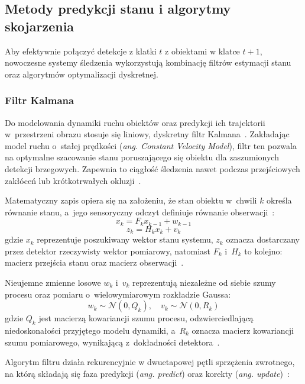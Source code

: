 \subsection{Metody predykcji stanu i algorytmy skojarzenia}
Aby efektywnie połączyć detekcje z klatki $t$ z obiektami w klatce $t+1$, nowoczesne systemy
śledzenia wykorzystują kombinację filtrów estymacji stanu oraz algorytmów optymalizacji dyskretnej.

\subsubsection{Filtr Kalmana}

Do modelowania dynamiki ruchu obiektów oraz predykcji ich trajektorii w~przestrzeni obrazu stosuje
się liniowy, dyskretny filtr Kalmana~\cite{kalman1960, bewley2016}. Zakładając model ruchu o~stałej
prędkości (\textit{ang. Constant Velocity Model}), filtr ten pozwala na optymalne szacowanie stanu
poruszającego się obiektu dla zaszumionych detekcji brzegowych. Zapewnia to ciągłość śledzenia
nawet podczas przejściowych zakłóceń lub krótkotrwałych okluzji~\cite{bewley2016}.

Matematyczny zapis opiera się na założeniu, że stan obiektu w~chwili $k$ określa równanie stanu,
a~jego sensoryczny odczyt definiuje równanie obserwacji~\cite{kalman1960}:
\begin{equation}
  x_k = F_k x_{k-1} + w_{k-1}
  \label{eq:state_equation}
\end{equation}
\begin{equation}
  z_k = H_k x_k + v_k
  \label{eq:measurement_equation}
\end{equation}
gdzie $x_k$ reprezentuje poszukiwany wektor stanu systemu, $z_k$ oznacza dostarczany przez detektor rzeczywisty wektor pomiarowy, natomiast $F_k$ i~$H_k$ to kolejno: macierz przejścia stanu oraz macierz obserwacji~\cite{kalman1960}.

Nieujemne zmienne losowe $w_k$ i~$v_k$ reprezentują niezależne od siebie szumy procesu oraz pomiaru
o~wielowymiarowym rozkładzie Gaussa:
\begin{equation}
  w_k \sim \mathcal{N}(0, Q_k), \quad v_k \sim \mathcal{N}(0, R_k)
\end{equation}
gdzie $Q_k$ jest macierzą kowariancji szumu procesu, odzwierciedlającą niedoskonałości przyjętego modelu dynamiki, a~$R_k$ oznacza macierz kowariancji szumu pomiarowego, wynikającą z~dokładności detektora~\cite{kalman1960}.

Algorytm filtru działa rekurencyjnie w dwuetapowej pętli sprzężenia zwrotnego, na którą składają
się faza predykcji (\textit{ang. predict}) oraz korekty (\textit{ang. update})~\cite{kalman1960,
  ryspekov2026}:

